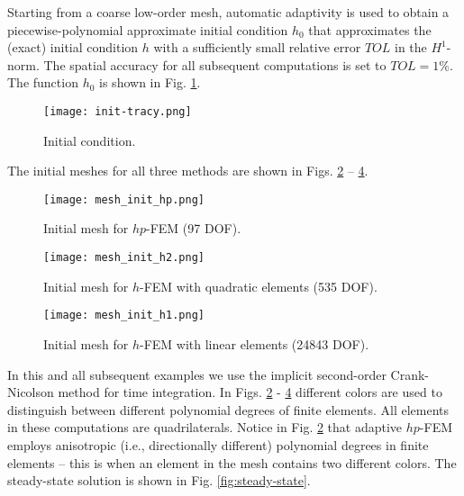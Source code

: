 \documentclass[final,3p,times,twocolumn]{elsarticle}
\begin{document}
Starting from a coarse low-order mesh, automatic adaptivity is used
to obtain a piecewise-polynomial approximate initial condition 
$h_0$ that approximates the (exact) initial condition $h$ with 
a sufficiently small relative error $TOL$ in the $H^1$-norm. The 
spatial accuracy for all subsequent computations is set to $TOL = 1\%$.
The function $h_0$ is shown in Fig. \ref{fig:init-cond}.

\begin{figure}[!ht]
\begin{center}
\texttt{[image: init-tracy.png]}
\end{center}
\vspace{-6mm}
\caption{Initial condition.}
\label{fig:init-cond}
\end{figure}
\vspace{4mm}
\noindent
The initial meshes for all three methods are shown in 
Figs. \ref{fig:init-meshes-1} -- \ref{fig:init-meshes-3}.

\begin{figure}[!ht]
\begin{center}
\texttt{[image: mesh\_init\_hp.png]}
\end{center}
\vspace{-6mm}
\caption{Initial mesh for $hp$-FEM (97 DOF).}
\label{fig:init-meshes-1}
\end{figure}

\begin{figure}[!ht]
\begin{center}
\texttt{[image: mesh\_init\_h2.png]}
\end{center}
\vspace{-6mm}
\caption{Initial mesh for $h$-FEM with quadratic elements (535 DOF).}
\label{fig:init-meshes-2}
\end{figure}

\begin{figure}[!ht]
\begin{center}
\texttt{[image: mesh\_init\_h1.png]}
\end{center}
\vspace{-6mm}
\caption{Initial mesh for $h$-FEM with linear elements (24843 DOF).}
\label{fig:init-meshes-3}
\end{figure}
In this and all subsequent examples we use the implicit second-order 
Crank-Nicolson method for time integration.
In Figs. \ref{fig:init-meshes-1} - \ref{fig:init-meshes-3} 
different colors are used to distinguish between 
different polynomial degrees of finite elements. All elements in these computations 
are quadrilaterals. Notice in Fig. \ref{fig:init-meshes-1} that adaptive $hp$-FEM employs
anisotropic (i.e., directionally different) polynomial degrees in finite 
elements -- this is when an element in the mesh contains two different colors. 
The steady-state solution is shown in Fig. \ref{fig:steady-state}. 
\end{document}
